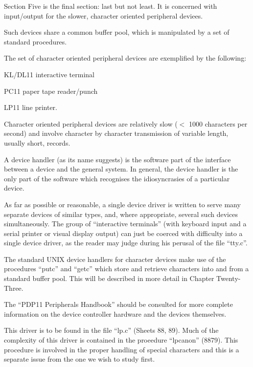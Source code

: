 %
%
{\sf Section Five is the final section: last
but not least. It is concerned with
input/output for the slower, character
oriented peripheral deviees.

Such devices share a common buffer
pool, which is manipulated by a set of
standard procedures.

The set of character oriented peripheral devices are exemplified by the
following:

\bi
\item KL/DL11 interactive terminal
\item PC11 paper tape reader/punch
\item LP11 line printer.
\ei
}


Character oriented peripheral devices
are relatively slow ($<$ 1000 characters
per second) and involve character by
character transmission of variable
length, usually short, records.

A device handler (as its name suggests)
is the software part of the interface
between a device and the general system. In general, the device handler is
the only part of the software which
recognises the idiosyncrasies of a particular device.

As far as possible or reasonable, a
single device driver is written to
serve many separate devices of similar
types, and, where appropriate, several
such devices simultaneously. The group
of ``interactive terminals'' (with keyboard input and a serial printer or
visual display output) can just be
coerced with difficulty into a single
device driver, as the reader may judge
during his perusal of the file ``tty.c''.

The standard UNIX device handlers for
character devices make use of the procedures ``putc'' and ``getc'' which store
and retrieve characters into and from a
standard buffer pool. This will be
described in more detail in Chapter
Twenty-Three.

The ``PDP11 Peripherals Handbook'' should
be consulted for more complete information on the device controller hardware
and the devices themselves.


This driver is to be found in the file
``lp.c'' (Sheets 88, 89). Much of the
complexity of this driver is contained
in the proeedure ``lpcanon'' (8879).
This procedure is involved in the
proper handling of special characters
and this is a separate issue from the
one we wish to study first.

